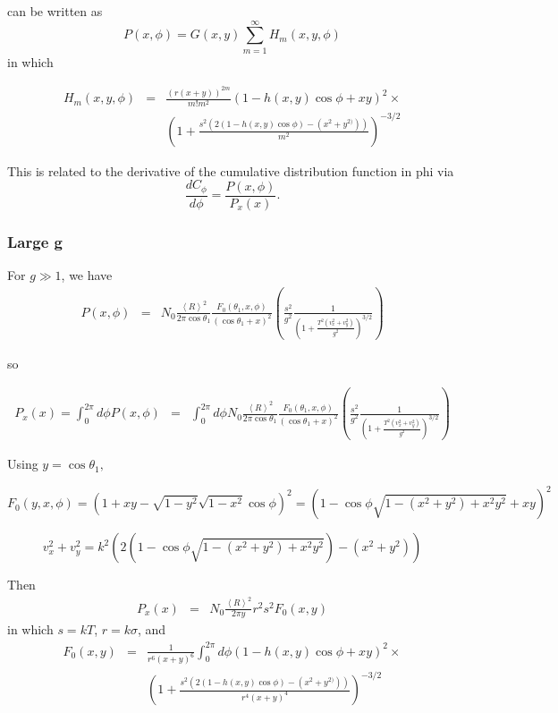 \documentclass[11pt]{article}
\newcommand{\der}[2]{\frac{d {#1}}{d {#2}}}
\begin{document}
{{{{can be written as
$$P(x,\phi)=G(x,y)\sum_{m=1}^{\infty}H_{m}(x,y,\phi)$$
in which


\begin{eqnarray} H_{m}(x,y,\phi)&=&\frac{(r(x+y))^{2m}}{m!m^{2}}\left(1-h(x,y)\cos\phi +xy\right)^{2}\times\\
&&\left(1+\frac{s^{2}\left(2(1-h(x,y)\cos\phi )-(x^{2}+y^{2)})\right)}{m^{2}}\right)^{-3/2}
\end{eqnarray}

This is related to the derivative of the cumulative distribution function in phi via
$$\der{C_{\phi}}{\phi}=\frac{P(x,\phi)}{P_{x}(x)}.$$

\subsubsection{Large g}

For $g\gg 1$, we have
\begin{eqnarray}
P(x,\phi)&=&N_{0}\frac{\left<R\right>^{2}}{2\pi\cos\theta_{1}}\frac{F_{0}(\theta_{1},x,\phi)}{(\cos{\theta_{1}}+x)^{2}}
\left(\frac{s^{2}}{g^{2}}\frac{1}{\left(1+\frac{T^{2}(v_{x}^{2}+v_{y}^{2})}{g^{2}}\right)^{3/2}}\right)\end{eqnarray}

so

\begin{eqnarray}
P_{x}(x)=\int_{0}^{2\pi}d\phi P(x,\phi)&=&
\int_{0}^{2\pi}d\phi N_{0}\frac{\left<R\right>^{2}}{2\pi\cos\theta_{1}}\frac{F_{0}(\theta_{1},x,\phi)}{(\cos{\theta_{1}}+x)^{2}}
\left(\frac{s^{2}}{g^{2}}\frac{1}{\left(1+\frac{T^{2}(v_{x}^{2}+v_{y}^{2})}{g^{2}}\right)^{3/2}}\right)\end{eqnarray}

Using $y=\cos\theta_{1},$

$$F_{0}(y,x,\phi)=\left(1+xy-\sqrt{1-y^{2}}\sqrt{1-x^{2}}\cos\phi\right)^{2}=\left(1-\cos\phi\sqrt{1-(x^{2}+y^{2})+x^{2}y^{2}}+xy\right)^{2}$$


$$v_{x}^{2}+v_{y}^{2}=k^{2}\left(2\left(1-\cos\phi\sqrt{1-(x^{2}+y^{2})+x^{2}y^{2}}\right)-(x^{2}+y^{2})\right)$$

Then
\begin{eqnarray}
P_{x}(x)&=&N_{0}\frac{\left<R\right>^{2}}{2\pi y}
r^{2}s^{2}
F_{0}(x,y)
\end{eqnarray}
in which $s=kT$, $r=k\sigma$, and 
\begin{eqnarray} F_{0}(x,y)&=&\frac{1}{r^{6}(x+y)^{6}}\int_{0}^{2\pi}d\phi\left(1-h(x,y)\cos\phi +xy\right)^{2}\times\\
&&\left(1+\frac{s^{2}\left(2(1-h(x,y)\cos\phi) -(x^{2}+y^{2)})\right)}{r^{4}(x+y)^{4}}\right)^{-3/2}
\end{eqnarray}

}}}}
\end{document}
